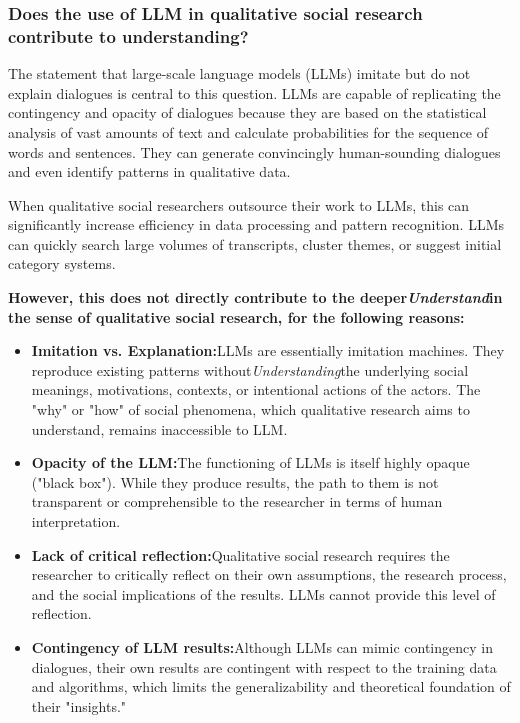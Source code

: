 \documentclass[
]{article}
\author{}
\date{}
\begin{document}
\subsubsection{\texorpdfstring{\textbf{Does the use of LLM in
qualitative social research contribute to
understanding?}}{Does the use of LLM in qualitative social research contribute to understanding?}}\label{does-the-use-of-llm-in-qualitative-social-research-contribute-to-understanding}

The statement that large-scale language models (LLMs) imitate but do not
explain dialogues is central to this question. LLMs are capable of
replicating the contingency and opacity of dialogues because they are
based on the statistical analysis of vast amounts of text and calculate
probabilities for the sequence of words and sentences. They can generate
convincingly human-sounding dialogues and even identify patterns in
qualitative data.

When qualitative social researchers outsource their work to LLMs, this
can significantly increase efficiency in data processing and pattern
recognition. LLMs can quickly search large volumes of transcripts,
cluster themes, or suggest initial category systems.

\textbf{However, this does not directly contribute to the
deeper\emph{Understand}in the sense of qualitative social research, for
the following reasons:}

\begin{itemize}
\item
  \textbf{Imitation vs. Explanation:}LLMs are essentially imitation
  machines. They reproduce existing patterns
  without\emph{Understanding}the underlying social meanings,
  motivations, contexts, or intentional actions of the actors. The "why"
  or "how" of social phenomena, which qualitative research aims to
  understand, remains inaccessible to LLM.
\item
  \textbf{Opacity of the LLM:}The functioning of LLMs is itself highly
  opaque ("black box"). While they produce results, the path to them is
  not transparent or comprehensible to the researcher in terms of human
  interpretation.
\item
  \textbf{Lack of critical reflection:}Qualitative social research
  requires the researcher to critically reflect on their own
  assumptions, the research process, and the social implications of the
  results. LLMs cannot provide this level of reflection.
\item
  \textbf{Contingency of LLM results:}Although LLMs can mimic
  contingency in dialogues, their own results are contingent with
  respect to the training data and algorithms, which limits the
  generalizability and theoretical foundation of their "insights."
\end{itemize}
\end{document}

